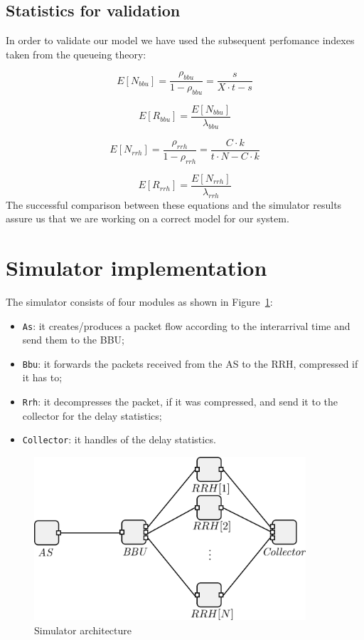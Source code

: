 \documentclass[11pt,a4paper,oneside, openright]{article}
\begin{document}
\subsection{Statistics for validation}
In order to validate our model we have used the subsequent perfomance indexes taken from the queueing theory:

$$ E[N_{bbu}] = \frac{\rho_{bbu}}{1 - \rho_{bbu}} = \frac{s}{X \cdot t - s}$$

$$ E[R_{bbu}] = \frac{E[N_{bbu}]}{\lambda_{bbu}} $$

$$ E[N_{rrh}] = \frac{\rho_{rrh}}{1 - \rho_{rrh}} = \frac{C \cdot k}{t \cdot N - C \cdot k}$$

$$ E[R_{rrh}] = \frac{E[N_{rrh}]}{\lambda_{rrh}} $$
The successful comparison between these equations and the simulator results assure us that we are working on a correct model for our system.

\section{Simulator implementation}
The simulator consists of four modules as shown in Figure~\ref{fig:simulator}:
\begin{itemize}
  \item \texttt{As}: it creates/produces a packet flow according to the interarrival time and send them to the BBU;
  \item \texttt{Bbu}: it forwards the packets received from the AS to the RRH, compressed if it has to;
  \item \texttt{Rrh}: it decompresses the packet, if it was compressed, and send it to the collector for the delay statistics;
  \item \texttt{Collector}: it handles of the delay statistics.
\end{itemize}

\begin{figure}[h]
    \centering
    \includegraphics[width=0.9\textwidth]{images/simulator}
    \caption{Simulator architecture}
    \label{fig:simulator}
\end{figure}
\end{document}
